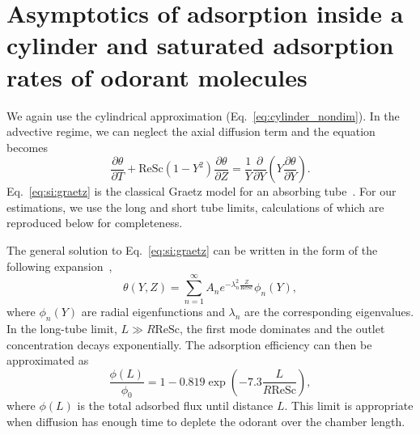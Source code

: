 \documentclass[%
 twocolumn,
 amsmath,amssymb,
 aps,prfluids,
 superscriptaddress,
]{revtex4-2}
\newcommand{\Sc}{\mathrm{Sc}}
\newcommand{\Rey}{\mathrm{Re}}
\begin{document}
\makeatletter
\let\@hangfrom@section\saved@hangfrom@section
\let\@sectioncntformat\saved@sectioncntformat
\makeatother

\renewcommand{\thesection}{S~\Roman{section}}
\setcounter{section}{0}

\section{Asymptotics of adsorption inside a cylinder and saturated adsorption rates of odorant molecules}
\label{sec:si:molecules}

We again use the cylindrical approximation (Eq.~\eqref{eq:cylinder_nondim}). In the advective regime, we can neglect the axial diffusion term and the equation becomes 
\begin{equation}
    \frac{\partial \theta}{\partial T}
+
\Rey\Sc(1-Y^2)\frac{\partial \theta} {\partial Z}
=
\frac{1}{Y}\frac{\partial}{\partial Y}\left(Y\frac{\partial \theta}{\partial Y}\right).
\label{eq:si:graetz}
\end{equation}
Eq.~\eqref{eq:si:graetz} is the classical Graetz model for an absorbing tube~\cite{brown1960heat,shah2014laminar}. For our estimations, we use the long and short tube limits, calculations of which are reproduced below for completeness.

The general solution to Eq.~\eqref{eq:si:graetz} can be written in the form of the following expansion~\cite{brown1960heat,shah2014laminar},
\begin{equation}
\theta(Y,Z)=\sum_{n=1}^{\infty}A_n e^{-\lambda_n^2 \frac{Z}{\Rey\Sc}}\phi_n(Y),
\label{eq:si:graetz_series}
\end{equation}
where $\phi_n(Y)$ are radial eigenfunctions and $\lambda_n$ are the corresponding eigenvalues. In the long-tube limit, $L\gg R\Rey\Sc$, the first mode dominates and the outlet concentration decays exponentially. The adsorption efficiency can then be approximated as
\begin{equation}
\frac{\phi(L)}{\phi_0}=1-0.819\exp\left(-7.3\frac{L}{R\Rey\Sc}\right),
\label{eq:si:flux_longtube}
\end{equation}
where $\phi(L)$ is the total adsorbed flux until distance $L$. This limit is appropriate when diffusion has enough time to deplete the odorant over the chamber length.
\end{document}
